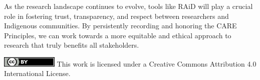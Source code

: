 \documentclass[a0,portrait]{a0poster}
\begin{document}
\begin{multicols}{2}
{As the research landscape continues to evolve, tools like RAiD will play a crucial role in fostering trust, transparency, and respect between researchers and Indigenous communities. By persistently recording and honoring the CARE Principles, we can work towards a more equitable and ethical approach to research that truly benefits all stakeholders.
}

\vfill

\begin{center}
\includegraphics[height=0.5cm]{cc-by.png}
This work is licensed under a Creative Commons Attribution 4.0 International License.
\end{center}

\end{multicols}
\end{document}
